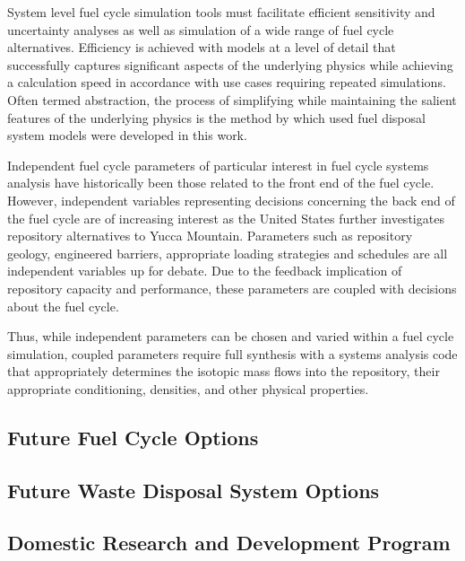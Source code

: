 System level fuel cycle simulation tools must facilitate efficient sensitivity 
and uncertainty analyses as well as simulation of a wide range of fuel cycle 
alternatives.  Efficiency is achieved with models at a level of detail that 
successfully captures significant aspects of the underlying physics while 
achieving a calculation speed in accordance with use cases requiring repeated 
simulations.
Often termed abstraction, the process of simplifying while 
maintaining the salient features of the underlying physics is the method by 
which used fuel disposal system models were developed in this work. 


Independent fuel cycle parameters of particular interest in fuel cycle systems 
analysis have historically been those related to the front end of the fuel 
cycle.
However, independent variables representing decisions concerning the back end
of the fuel cycle are of increasing interest as the United States further
investigates repository alternatives to Yucca Mountain.  Parameters such as
repository geology, engineered barriers, appropriate loading strategies and
schedules are all independent variables up for debate. Due to the feedback 
implication of repository capacity and performance, these
parameters are coupled with decisions about the fuel cycle. 


Thus, while independent parameters can be chosen and varied within a fuel cycle 
simulation, coupled parameters require full synthesis with a systems analysis 
code that appropriately determines the isotopic mass flows into the repository, 
their appropriate conditioning, densities, and other physical properties.  

\subsection{Future Fuel Cycle Options}

\subsection{Future Waste Disposal System Options}

\subsection{Domestic Research and Development Program}


